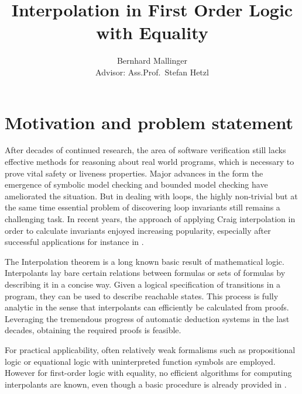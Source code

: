\documentclass[,%
			paper=a4,%
			DIV12,
			liststotoc,
			bibtotoc,
			draft=false,%
			numbers=noendperiod
			]{scrartcl}
\title{Interpolation in First Order Logic with Equality}
\author{Bernhard Mallinger \medskip \\
Advisor: Ass.Prof.\ Stefan Hetzl}
\theoremstyle{definition}
\begin{document}
\maketitle

\section{Motivation and problem statement}
\label{motivation}

After decades of continued research, the area of software verification still lacks effective methods for reasoning about real world programs, which is necessary to prove vital safety or liveness properties.
Major advances in the form the emergence of symbolic model checking and bounded model checking have ameliorated the situation. But in dealing with loops, the highly non-trivial but at the same time essential problem of discovering loop invariants still remains a challenging task. 
In recent years, the approach of applying Craig interpolation in order to calculate invariants enjoyed increasing popularity, especially after successful applications for instance in \cite{McMillan03}.

The Interpolation theorem is a long known basic result of mathematical logic.
Interpolants lay bare certain relations between formulas or sets of formulas by describing it in a concise way. 
Given a logical specification of transitions in a program, they can be used to describe reachable states.
This process is fully analytic in the sense that interpolants can efficiently be calculated from proofs.
Leveraging the tremendous progress of automatic deduction systems in the last decades, obtaining the required proofs is feasible.


For practical applicability, often relatively weak formalisms such as propositional logic or equational logic with uninterpreted function symbols are employed.
However for first-order logic with equality, no efficient algorithms for computing interpolants are known, even though a basic procedure is already provided in \cite{craig57linear}.


\begin{comment}
Software verification
Model checking
Derive invariants
interpolation by its nature disregards all but the predicates relevant to a certain property
can be used for predicate refinement in cegar

often restricted to weaker logics, application to more powerful formalisms such as fol with equality is relevant 
\end{comment}
\end{document}
